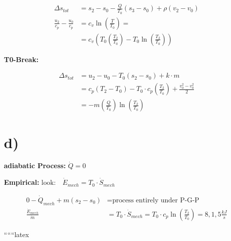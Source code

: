 \begin{align*}
\Delta s_{tot} &= s_2 - s_0 - \frac{Q}{T_0}(s_3 - s_0) + \rho(v_2 - v_0) \\
\frac{u_2}{c_p} - \frac{u_0}{c_p} &= c_v \ln \left( \frac{T}{T_0} \right) = \\
&= c_v \left( T_0 \left( \frac{T_2}{T_0} \right) - T_0 \ln \left( \frac{T_2}{T_0} \right) \right)
\end{align*}

\textbf{T0-Break:}

\begin{align*}
\Delta s_{tot} &= u_2 - u_0 - T_0(s_2 - s_0) + k \cdot m \\
&= c_p \left( T_2 - T_0 \right) - T_0 \cdot c_p \left( \frac{T_2}{T_0} \right) + \frac{v_0^2 - v_0^2}{2} \\
&= -m \left( \frac{Q}{T_0} \right) \ln \left( \frac{T_2}{T_0} \right)
\end{align*}

\section*{d)}

\textbf{adiabatic Process:} \(\dot{Q} = 0\)

\textbf{Empirical:} \(\text{look:} \quad \dot{E}_{mech} = T_0 \cdot \dot{S}_{mech}\)

\begin{align*}
0 - \dot{Q}_{mech} + m \left( s_2 - s_0 \right) &= \text{process entirely under P-G-P} \\
\frac{\dot{E}_{mech}}{\dot{m}} &= T_0 \cdot \dot{S}_{mech} = T_0 \cdot c_p \ln \left( \frac{T_2}{T_0} \right) = 8,1,5 \frac{kJ}{s}
\end{align*}

``````latex


